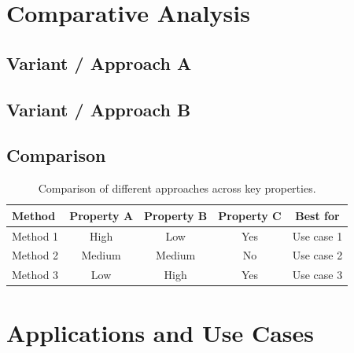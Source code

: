 \documentclass[12pt, a4paper]{article}
\begin{document}
\section{Comparative Analysis}

\lipsum[10]

\subsection{Variant / Approach A}
\lipsum[11]

\subsection{Variant / Approach B}
\lipsum[12]

\subsection{Comparison}

\begin{table}[H]
    \centering
    \caption{Comparison of different approaches across key properties.}
    \label{tab:comparison}
    \begin{tabular}{@{}lcccc@{}}
        \toprule
        \textbf{Method} & \textbf{Property A} & \textbf{Property B}
                        & \textbf{Property C} & \textbf{Best for} \\
        \midrule
        Method 1  & High   & Low    & Yes & Use case 1 \\
        Method 2  & Medium & Medium & No  & Use case 2 \\
        Method 3  & Low    & High   & Yes & Use case 3 \\
        \bottomrule
    \end{tabular}
\end{table}

\section{Applications and Use Cases}

\lipsum[13]
\end{document}
